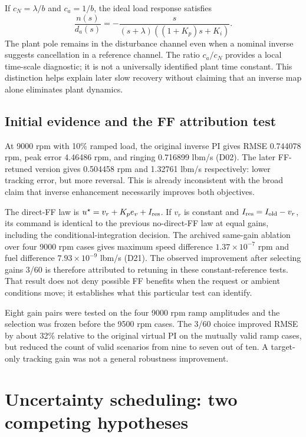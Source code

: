 \documentclass[11pt,a4paper,oneside]{report}
\begin{document}
If $c_N=\lambda/b$ and $c_a=1/b$, the ideal load response satisfies
\begin{equation}
\frac{n(s)}{d_a(s)}=-\frac{s}{(s+\lambda)((1+K_p)s+K_i)}.
\end{equation}
The plant pole remains in the disturbance channel even when a nominal inverse suggests cancellation in a reference channel. The ratio $c_a/c_N$ provides a local time-scale diagnostic; it is not a universally identified plant time constant. This distinction helps explain later slow recovery without claiming that an inverse map alone eliminates plant dynamics.

\section{Initial evidence and the FF attribution test}
At 9000 rpm with 10\% ramped load, the original inverse PI gives RMSE 0.744078 rpm, peak error 4.46486 rpm, and ringing 0.716899 lbm/s (D02). The later FF-retuned version gives 0.504458 rpm and 1.32761 lbm/s respectively: lower tracking error, but more reversal. This is already inconsistent with the broad claim that inverse enhancement necessarily improves both objectives.

The direct-FF law is $u^\star=v_r+K_pe_v+I_{\rm res}$. If $v_r$ is constant and $I_{\rm res}=I_{\rm old}-v_r$, its command is identical to the previous no-direct-FF law at equal gains, including the conditional-integration decision. The archived same-gain ablation over four 9000 rpm cases gives maximum speed difference $1.37\times10^{-7}$ rpm and fuel difference $7.93\times10^{-9}$ lbm/s (D21). The observed improvement after selecting gains 3/60 is therefore attributed to retuning in these constant-reference tests. That result does not deny possible FF benefits when the request or ambient conditions move; it establishes what this particular test can identify.

Eight gain pairs were tested on the four 9000 rpm ramp amplitudes and the selection was frozen before the 9500 rpm cases. The 3/60 choice improved RMSE by about 32\% relative to the original virtual PI on the mutually valid ramp cases, but reduced the count of valid scenarios from nine to seven out of ten. A target-only tracking gain was not a general robustness improvement.

\chapter{Uncertainty scheduling: two competing hypotheses}
\end{document}

